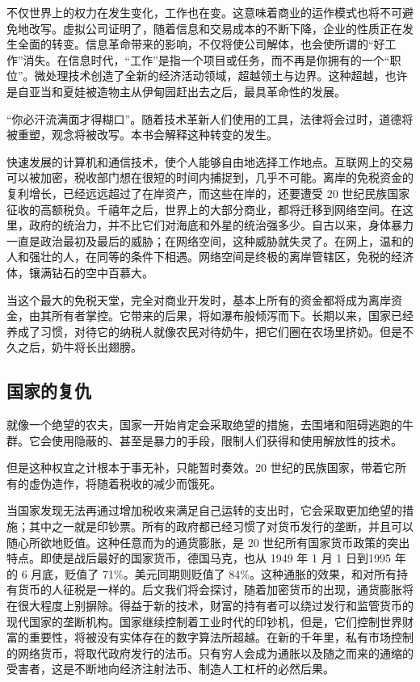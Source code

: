 不仅世界上的权力在发生变化，工作也在变。这意味着商业的运作模式也将不可避免地改写。虚拟公司证明了，随着信息和交易成本的不断下降，企业的性质正在发生全面的转变。信息革命带来的影响，不仅将使公司解体，也会使所谓的“好工作”消失。在信息时代，“工作”是指一个项目或任务，而不再是你拥有的一个“职位”。微处理技术创造了全新的经济活动领域，超越领土与边界。这种超越，也许是自亚当和夏娃被造物主从伊甸园赶出去之后，最具革命性的发展。


“你必汗流满面才得糊口”。随着技术革新人们使用的工具，法律将会过时，道德将被重塑，观念将被改写。本书会解释这种转变的发生。


快速发展的计算机和通信技术，使个人能够自由地选择工作地点。互联网上的交易可以被加密，税收部门想在很短的时间内捕捉到，几乎不可能。离岸的免税资金的复利增长，已经远远超过了在岸资产，而这些在岸的，还要遭受 20 世纪民族国家征收的高额税负。千禧年之后，世界上的大部分商业，都将迁移到网络空间。在这里，政府的统治力，并不比它们对海底和外星的统治强多少。自古以来，身体暴力一直是政治最初及最后的威胁；在网络空间，这种威胁就失灵了。在网上，温和的人和强壮的人，在同等的条件下相遇。网络空间是终极的离岸管辖区，免税的经济体，镶满钻石的空中百慕大。


当这个最大的免税天堂，完全对商业开发时，基本上所有的资金都将成为离岸资金，由其所有者掌控。它带来的后果，将如瀑布般倾泻而下。长期以来，国家已经养成了习惯，对待它的纳税人就像农民对待奶牛，把它们圈在农场里挤奶。但是不久之后，奶牛将长出翅膀。



\subsection{国家的复仇}
就像一个绝望的农夫，国家一开始肯定会采取绝望的措施，去围堵和阻碍逃跑的牛群。它会使用隐蔽的、甚至是暴力的手段，限制人们获得和使用解放性的技术。


但是这种权宜之计根本于事无补，只能暂时奏效。20 世纪的民族国家，带着它所有的虚伪造作，将随着税收的减少而饿死。


当国家发现无法再通过增加税收来满足自己运转的支出时，它会采取更加绝望的措施；其中之一就是印钞票。所有的政府都已经习惯了对货币发行的垄断，并且可以随心所欲地贬值。这种任意而为的通货膨胀，是 20 世纪所有国家货币政策的突出特点。即使是战后最好的国家货币，德国马克，也从 1949 年 1 月 1 日到1995 年的 6 月底，贬值了 71\%。美元同期则贬值了 84\%。这种通胀的效果，和对所有持有货币的人征税是一样的。后文我们将会探讨，随着加密货币的出现，通货膨胀将在很大程度上别摒除。得益于新的技术，财富的持有者可以绕过发行和监管货币的现代国家的垄断机构。国家继续控制着工业时代的印钞机，但是，它们控制世界财富的重要性，将被没有实体存在的数字算法所超越。在新的千年里，私有市场控制的网络货币，将取代政府发行的法币。只有穷人会成为通胀以及随之而来的通缩的受害者，这是不断地向经济注射法币、制造人工杠杆的必然后果。


